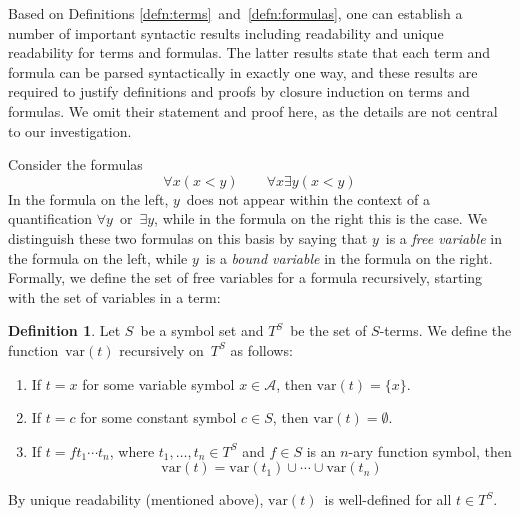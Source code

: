 \documentclass[letterpaper]{article}
\newcommand{\union}{\cup}
\newcommand{\var}{\mathrm{var}}
\numberwithin{equation}{section}
\theoremstyle{plain}
\theoremstyle{definition}
\newtheorem{defn}[equation]{Definition}
\begin{document}
Based on Definitions \ref{defn:terms}~and~\ref{defn:formulas}, one can establish a number of important syntactic results including readability and unique readability for terms and formulas. The latter results state that each term and formula can be parsed syntactically in exactly one way, and these results are required to justify definitions and proofs by closure induction on terms and formulas. We omit their statement and proof here, as the details are not central to our investigation.

Consider the formulas
$$\forall x(x<y)\qquad\forall x\exists y(x<y)$$
In the formula on the left, $y$~does not appear within the context of a quantification $\forall y$~or~$\exists y$, while in the formula on the right this is the case. We distinguish these two formulas on this basis by saying that $y$~is a \emph{free variable} in the formula on the left, while $y$~is a \emph{bound variable} in the formula on the right. Formally, we define the set of free variables for a formula recursively, starting with the set of variables in a term:
\begin{defn}
Let $S$~be a symbol set and $T^S$~be the set of $S$-terms. We define the function~$\var(t)$ recursively on~$T^S$ as follows:
\begin{enumerate}[itemsep=0pt]
\item If $t=x$ for some variable symbol $x\in\mathcal{A}$, then $\var(t)=\{x\}$.
\item If $t=c$ for some constant symbol $c\in S$, then $\var(t)=\emptyset$.
\item If $t=ft_1\cdots t_n$, where $t_1,\ldots,t_n\in T^S$ and $f\in S$ is an $n$-ary function symbol, then
$$\var(t)=\var(t_1)\union\cdots\union\var(t_n)$$
\end{enumerate}
\end{defn}
\noindent By unique readability (mentioned above), $\var(t)$~is well-defined for all $t\in T^S$.
\end{document}
